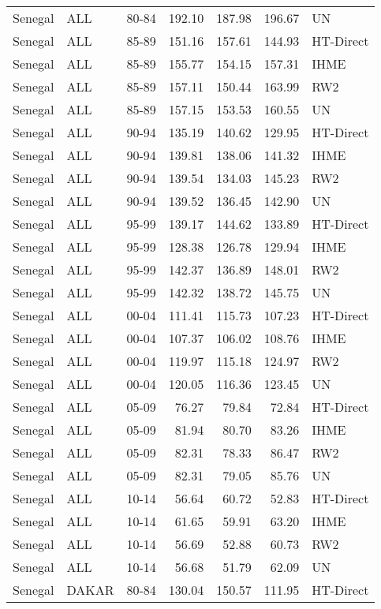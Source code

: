 \begin{longtable}{lllrrrl}
  Senegal & ALL & 80-84 & 192.10 & 187.98 & 196.67 & UN \\ 
  Senegal & ALL & 85-89 & 151.16 & 157.61 & 144.93 & HT-Direct \\ 
  Senegal & ALL & 85-89 & 155.77 & 154.15 & 157.31 & IHME \\ 
  Senegal & ALL & 85-89 & 157.11 & 150.44 & 163.99 & RW2 \\ 
  Senegal & ALL & 85-89 & 157.15 & 153.53 & 160.55 & UN \\ 
  Senegal & ALL & 90-94 & 135.19 & 140.62 & 129.95 & HT-Direct \\ 
  Senegal & ALL & 90-94 & 139.81 & 138.06 & 141.32 & IHME \\ 
  Senegal & ALL & 90-94 & 139.54 & 134.03 & 145.23 & RW2 \\ 
  Senegal & ALL & 90-94 & 139.52 & 136.45 & 142.90 & UN \\ 
  Senegal & ALL & 95-99 & 139.17 & 144.62 & 133.89 & HT-Direct \\ 
  Senegal & ALL & 95-99 & 128.38 & 126.78 & 129.94 & IHME \\ 
  Senegal & ALL & 95-99 & 142.37 & 136.89 & 148.01 & RW2 \\ 
  Senegal & ALL & 95-99 & 142.32 & 138.72 & 145.75 & UN \\ 
  Senegal & ALL & 00-04 & 111.41 & 115.73 & 107.23 & HT-Direct \\ 
  Senegal & ALL & 00-04 & 107.37 & 106.02 & 108.76 & IHME \\ 
  Senegal & ALL & 00-04 & 119.97 & 115.18 & 124.97 & RW2 \\ 
  Senegal & ALL & 00-04 & 120.05 & 116.36 & 123.45 & UN \\ 
  Senegal & ALL & 05-09 & 76.27 & 79.84 & 72.84 & HT-Direct \\ 
  Senegal & ALL & 05-09 & 81.94 & 80.70 & 83.26 & IHME \\ 
  Senegal & ALL & 05-09 & 82.31 & 78.33 & 86.47 & RW2 \\ 
  Senegal & ALL & 05-09 & 82.31 & 79.05 & 85.76 & UN \\ 
  Senegal & ALL & 10-14 & 56.64 & 60.72 & 52.83 & HT-Direct \\ 
  Senegal & ALL & 10-14 & 61.65 & 59.91 & 63.20 & IHME \\ 
  Senegal & ALL & 10-14 & 56.69 & 52.88 & 60.73 & RW2 \\ 
  Senegal & ALL & 10-14 & 56.68 & 51.79 & 62.09 & UN \\ 
  Senegal & DAKAR & 80-84 & 130.04 & 150.57 & 111.95 & HT-Direct \\ 

\end{longtable}
